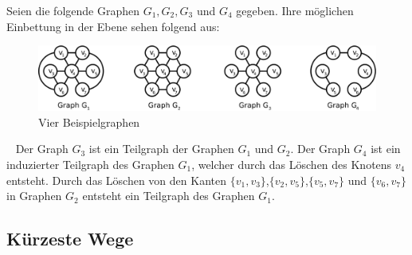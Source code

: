 \begin{bsp}
Seien die folgende Graphen $G_1,G_2,G_3$ und $G_4$ gegeben. Ihre möglichen Einbettung in der Ebene sehen folgend aus:
\begin{figure}[h!]
		\centering 		 
   \includegraphics[width=430pt]{bilder/bsp2.pdf}
	\caption{Vier Beispielgraphen}
  	 \end{figure}
  	 ~\newline  	 
Der Graph $G_3$ ist ein Teilgraph der Graphen $G_1$ und $G_2$. Der Graph $G_4$ ist ein induzierter Teilgraph des Graphen $G_1$, welcher durch das Löschen des Knotens $v_4$ entsteht. Durch das Löschen von den Kanten $\{v_1,v_3\}$,$\{v_2,v_5\}$,$\{v_5,v_7\}$ und $\{v_6,v_7\}$ in Graphen $G_2$ entsteht ein Teilgraph des Graphen $G_1$.
\end{bsp}
\subsection{Kürzeste Wege}

